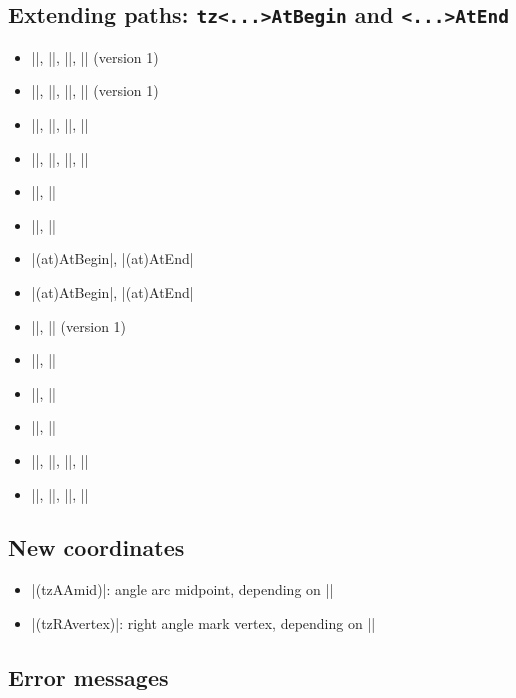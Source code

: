 \subsection{Extending paths: \texttt{\bs tz<...>AtBegin} and \texttt{\bs<...>AtEnd}}

\begin{itemize}\tightlist
\item |\tztoAtBegin|, |\tztoAtEnd|, |\tztosAtBegin|, |\tztosAtEnd| (version 1)
\item |\tztoAtBegin|, |\tztoAtEnd|, |\tztosAtBegin|, |\tztosAtEnd| (version 1)
\item |\tzlineAtBegin|, |\tzlineAtEnd|, |\tzlinesAtBegin|, |\tzlinesAtEnd|
\item |\tzlinkAtBegin|, |\tzlinkAtEnd|, |\tzlinksAtBegin|, |\tzlinksAtEnd|
\item |\tzbezierAtBegin|, |\tzbezierAtEnd|
\item |\tzparabolaAtBegin|, |\tzparabolaAtEnd|
%
\listdivider
\item |\tzvfn(at)AtBegin|, |\tzvfn(at)AtEnd|
\item |\tzhfn(at)AtBegin|, |\tzhfn(at)AtEnd|
%
\listdivider
\item |\tzfnAtBegin|, |\tzfnAtEnd| (version 1)
\item |\tzfnofyAtBegin|, |\tzfnofyAtEnd|
\item |\tzLFnAtBegin|, |\tzLFnAtEnd|
\item |\tzLfnofyAtBegin|, |\tzLFnofyAtEnd|
\item |\tzfnminAtBegin|, |\tzfnminAtEnd|, |\tzfnmaxAtBegin|, |\tzfnmaxAtEnd|
\item |\tzplotAtBegin|, |\tzplotAtEnd|, |\tzplotcurveAtBegin|, |\tzplotcurveAtEnd|
\end{itemize}



\subsection{New coordinates}

\begin{itemize}\tightlist
\item |(tzAAmid)|: angle arc midpoint, depending on |\tzanglemark|
\item |(tzRAvertex)|: right angle mark vertex, depending on |\tzrightanglemark|
\end{itemize}

\subsection{Error messages}

